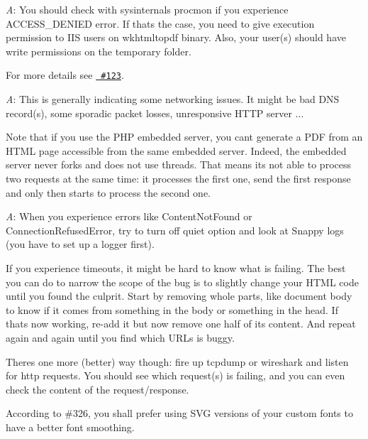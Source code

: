
{\itshape A}\+: You should check with sysinternals procmon if you experience {\ttfamily ACCESS\+\_\+\+DENIED} error. If that\textquotesingle{}s the case, you need to give execution permission to IIS users on wkhtmltopdf binary. Also, your user(s) should have write permissions on the temporary folder.

For more details see \href{https://github.com/KnpLabs/snappy/issues/123}{\texttt{ \#123}}.


{\itshape A}\+: This is generally indicating some networking issues. It might be bad DNS record(s), some sporadic packet losses, unresponsive HTTP server ...

Note that if you use the PHP embedded server, you can\textquotesingle{}t generate a PDF from an HTML page accessible from the same embedded server. Indeed, the embedded server never forks and does not use threads. That means it\textquotesingle{}s not able to process two requests at the same time\+: it processes the first one, send the first response and only then starts to process the second one.


{\itshape A}\+: When you experience errors like {\ttfamily Content\+Not\+Found} or {\ttfamily Connection\+Refused\+Error}, try to turn off {\ttfamily quiet} option and look at Snappy logs (you have to set up a logger first).

If you experience timeouts, it might be hard to know what is failing. The best you can do to narrow the scope of the bug is to slightly change your HTML code until you found the culprit. Start by removing whole parts, like document body to know if it comes from something in the body or something in the head. If that\textquotesingle{}s now working, re-\/add it but now remove one half of its content. And repeat again and again until you find which URLs is buggy.

There\textquotesingle{}s one more (better) way though\+: fire up tcpdump or wireshark and listen for http requests. You should see which request(s) is failing, and you can even check the content of the request/response.


According to \#326, you shall prefer using SVG versions of your custom fonts to have a better font smoothing. 